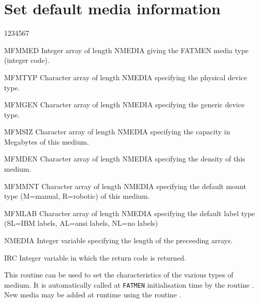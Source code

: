 \section{Set default media information}
\begin{DLtt}{1234567}
\item[MFMMED]
Integer array of length NMEDIA giving the FATMEN media type
(integer code).
\item[MFMTYP]
Character array of length NMEDIA specifying the physical device
type.
\item[MFMGEN]
Character array of length NMEDIA specifying the generic device
type.
\item[MFMSIZ]
Character array of length NMEDIA specifying the capacity in
Megabytes of this medium.
\item[MFMDEN]
Character array of length NMEDIA specifying the density
of this medium.
\item[MFMMNT]
Character array of length NMEDIA specifying the default
mount type (M=manual, R=robotic)
of this medium.
\item[MFMLAB]
Character array of length NMEDIA specifying the default
label type (SL=IBM labels, AL=ansi labels, NL=no labels)
\item[NMEDIA]
Integer variable specifying the length of the preceeding
arrays.
\item[IRC]
Integer variable in which the return code is returned.
\end{DLtt}
\par
This routine can be used to set the characteristics
of the various types of medium. It is automatically
called at {\tt FATMEN} initialisation time by the
routine . New media may be added at
runtime using the routine .

